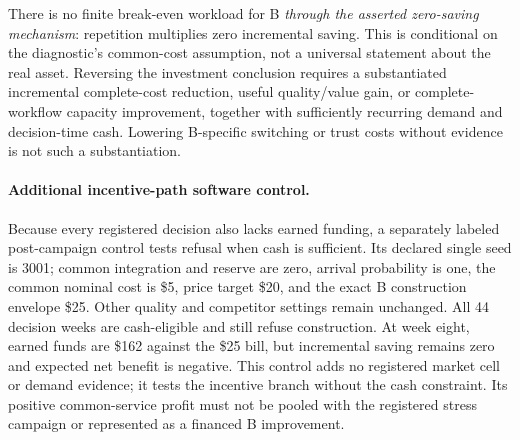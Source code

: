 There is no finite break-even workload for B \emph{through the asserted zero-saving mechanism}: repetition multiplies zero incremental saving. This is conditional on the diagnostic's common-cost assumption, not a universal statement about the real asset. Reversing the investment conclusion requires a substantiated incremental complete-cost reduction, useful quality/value gain, or complete-workflow capacity improvement, together with sufficiently recurring demand and decision-time cash. Lowering B-specific switching or trust costs without evidence is not such a substantiation.

\paragraph{Additional incentive-path software control.}
Because every registered decision also lacks earned funding, a separately labeled post-campaign control tests refusal when cash is sufficient. Its declared single seed is 3001; common integration and reserve are zero, arrival probability is one, the common nominal cost is \$5, price target \$20, and the exact B construction envelope \$25. Other quality and competitor settings remain unchanged. All 44 decision weeks are cash-eligible and still refuse construction. At week eight, earned funds are \$162 against the \$25 bill, but incremental saving remains zero and expected net benefit is negative. This control adds no registered market cell or demand evidence; it tests the incentive branch without the cash constraint. Its positive common-service profit must not be pooled with the registered stress campaign or represented as a financed B improvement.
